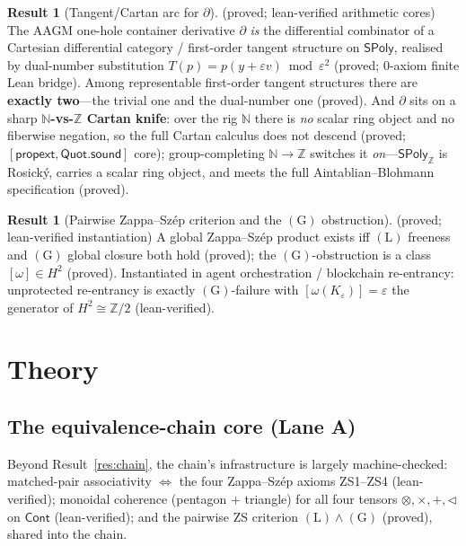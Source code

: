 \documentclass[11pt]{article}
\theoremstyle{definition}
\newtheorem{result}[theorem]{Result}
\newcommand{\SPoly}{\mathsf{SPoly}}
\newcommand{\Cont}{\mathsf{Cont}}
\newcommand{\N}{\mathbb{N}}
\newcommand{\Z}{\mathbb{Z}}
\newcommand{\grade}[1]{{\small\textsf{(#1)}}}
\begin{document}
\begin{result}[Tangent/Cartan arc for $\partial$]\grade{proved; lean-verified arithmetic cores}
\label{res:tangent}
The AAGM one-hole container derivative $\partial$ \emph{is} the differential combinator of a
Cartesian differential category / first-order tangent structure on $\SPoly$, realised by
dual-number substitution $T(p) = p(y+\varepsilon v) \bmod \varepsilon^2$
\grade{proved; 0-axiom finite Lean bridge}. Among representable first-order tangent structures
there are \textbf{exactly two}---the trivial one and the dual-number one \grade{proved}. And
$\partial$ sits on a sharp \textbf{$\N$-vs-$\Z$ Cartan knife}: over the rig $\N$ there is
\emph{no} scalar ring object and no fiberwise negation, so the full Cartan calculus does not
descend \grade{proved; $[\textsf{propext},\textsf{Quot.sound}]$ core}; group-completing
$\N\to\Z$ switches it \emph{on}---$\SPoly_\Z$ is Rosický, carries a scalar ring object, and
meets the full Aintablian--Blohmann specification \grade{proved}.
\end{result}

\begin{result}[Pairwise Zappa--Szép criterion and the $(\mathrm{G})$ obstruction]\grade{proved; lean-verified instantiation}
\label{res:zs}
A global Zappa--Szép product exists iff $(\mathrm{L})$ freeness and $(\mathrm{G})$ global
closure both hold \grade{proved}; the $(\mathrm{G})$-obstruction is a class $[\omega] \in H^2$
\grade{proved}. Instantiated in agent orchestration / blockchain re-entrancy: unprotected
re-entrancy is exactly $(\mathrm{G})$-failure with $[\omega(K_\varepsilon)] = \varepsilon$ the
generator of $H^2 \cong \Z/2$ \grade{lean-verified}.
\end{result}

\section{Theory}
\label{sec:theory}

\subsection{The equivalence-chain core (Lane A)}

Beyond Result~\ref{res:chain}, the chain's infrastructure is largely machine-checked:
matched-pair associativity $\Leftrightarrow$ the four Zappa--Szép axioms ZS1--ZS4
\grade{lean-verified}; monoidal coherence (pentagon + triangle) for all four tensors
$\otimes,\times,+,\lhd$ on $\Cont$ \grade{lean-verified}; and the pairwise ZS criterion
$(\mathrm{L})\wedge(\mathrm{G})$ \grade{proved}, shared into the chain.
\end{document}
